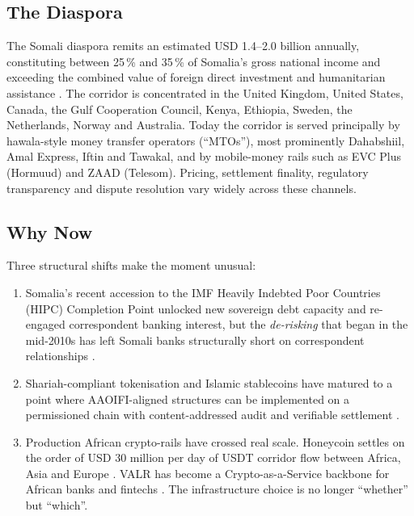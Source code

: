\documentclass[11pt,letterpaper]{article}
\begin{document}
\subsection{The Diaspora}
The Somali diaspora remits an estimated USD 1.4--2.0 billion annually,
constituting between 25\,\% and 35\,\% of Somalia's gross national
income and exceeding the combined value of foreign direct investment
and humanitarian assistance \cite{worldbank_remittances,
unctad_somalia}. The corridor is concentrated in the United Kingdom,
United States, Canada, the Gulf Cooperation Council, Kenya, Ethiopia,
Sweden, the Netherlands, Norway and Australia. Today the corridor is
served principally by hawala-style money transfer operators (``MTOs''),
most prominently Dahabshiil, Amal Express, Iftin and Tawakal, and by
mobile-money rails such as EVC Plus (Hormuud) and ZAAD (Telesom).
Pricing, settlement finality, regulatory transparency and dispute
resolution vary widely across these channels.

\subsection{Why Now}
Three structural shifts make the moment unusual:
\begin{enumerate}[leftmargin=1.6em]
  \item Somalia's recent accession to the IMF Heavily Indebted Poor
        Countries (HIPC) Completion Point unlocked new sovereign debt
        capacity and re-engaged correspondent banking interest, but the
        \emph{de-risking} that began in the mid-2010s has left Somali
        banks structurally short on correspondent relationships
        \cite{imf_somalia_hipc, fsb_derisking}.
  \item Shariah-compliant tokenisation and Islamic stablecoins have
        matured to a point where AAOIFI-aligned structures can be
        implemented on a permissioned chain with content-addressed
        audit and verifiable settlement \cite{aaoifi_standards}.
  \item Production African crypto-rails have crossed real scale.
        Honeycoin settles on the order of USD 30 million per day of
        USDT corridor flow between Africa, Asia and Europe
        \cite{honeycoin_techcrunch, honeycoin_site}. VALR has become
        a Crypto-as-a-Service backbone for African banks and fintechs
        \cite{valr_caas, valr_site}. The infrastructure choice is no
        longer ``whether'' but ``which''.
\end{enumerate}
\end{document}
